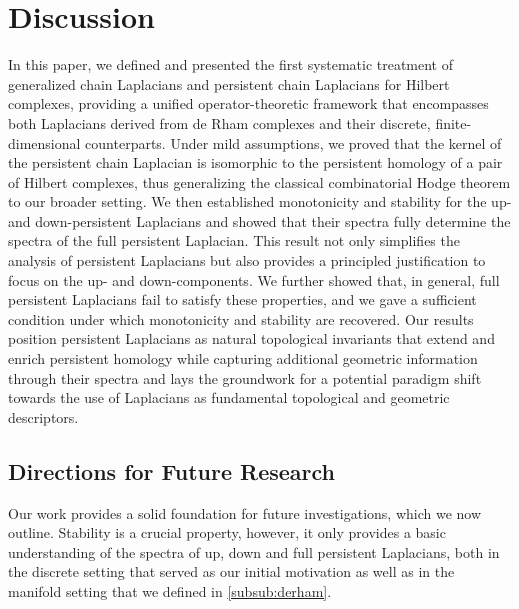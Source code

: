\documentclass[11pt]{article}
\theoremstyle{definition}
\theoremstyle{remark}
\begin{document}
\section{Discussion}
\label{sec:discussion}


In this paper, we defined and presented the first systematic treatment of generalized chain Laplacians and persistent chain Laplacians for Hilbert complexes, providing a unified operator-theoretic framework that encompasses both Laplacians derived from de Rham complexes and their discrete, finite-dimensional counterparts. Under mild assumptions, we proved that the kernel of the persistent chain Laplacian is isomorphic to the persistent homology of a pair of Hilbert complexes, thus generalizing the classical combinatorial Hodge theorem to our broader setting. We then established monotonicity and stability for the up- and down-persistent Laplacians and showed that their spectra fully determine the spectra of the full persistent Laplacian. This result not only simplifies the analysis of persistent Laplacians but also provides a principled justification to focus on the up- and down-components. We further showed that, in general, full persistent Laplacians fail to satisfy these properties, and we gave a sufficient condition under which monotonicity and stability are recovered. Our results position persistent Laplacians as natural topological invariants that extend and enrich persistent homology while capturing additional geometric information through their spectra and lays the groundwork for a potential paradigm shift towards the use of Laplacians as fundamental topological and geometric descriptors.

\subsection{Directions for Future Research}

Our work provides a solid foundation for future investigations, which we now outline. Stability is a crucial property, however, it only provides a basic understanding of the spectra of up, down and full persistent Laplacians, both in the discrete setting that served as our initial motivation as well as in the manifold setting that we defined in \cref{subsub:derham}. 
\end{document}
